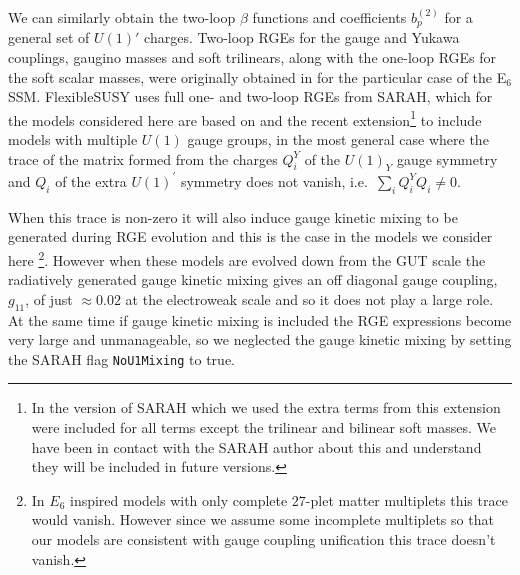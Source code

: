 \documentclass[preprint,amsmath,amssymb,aps,superscriptaddress,prd,showpacs,floatfix,nofootinbib]{revtex4-1}
\begin{document}
We can similarly obtain the two-loop $\beta$ functions and
coefficients $b_p^{(2)}$ for a general set of $U(1)'$
charges. Two-loop RGEs for the gauge and Yukawa couplings, gaugino masses and
soft trilinears, along with the one-loop RGEs for the soft scalar
masses, were originally obtained in \cite{Athron:2009bs} for the
particular case of the E$_6$SSM.  FlexibleSUSY uses full one- and
two-loop RGEs from SARAH, which for the models considered here are
based on \cite{Martin:1993zk} and the recent extension\footnote{In
the version of SARAH which we used the extra terms from this
extension were included for all terms except the trilinear and
bilinear soft masses. We have been in contact with the SARAH author
about this and understand they will be included in future
versions.}  \cite{Fonseca:2011vn} to include models with multiple
$U(1)$ gauge groups, in the most general case where the trace of the
matrix formed from the charges $Q^Y_i$ of the $U(1)_Y$ gauge symmetry
and $Q_i$ of the extra $U(1)^\prime$ symmetry does not vanish,
i.e.~$\sum_i Q_i^YQ_i \neq 0$.  

When this trace is non-zero it will also induce gauge kinetic mixing
to be generated during RGE evolution and this is the case in the
models we consider here \footnote{In $E_6$ inspired models with only
  complete $27$-plet matter multiplets this trace would vanish.
  However since we assume some incomplete multiplets so that our
  models are consistent with gauge coupling unification this trace
  doesn't vanish.}. However when these models are evolved down from
the GUT scale the radiatively generated gauge kinetic mixing gives an
off diagonal gauge coupling, $g_{11}$, of just $\approx 0.02$ at the
electroweak scale \cite{King:2005jy} and so it does not play a large
role.  At the same time if gauge kinetic mixing is included the RGE
expressions become very large and unmanageable, so we neglected the
gauge kinetic mixing by setting the SARAH flag \texttt{NoU1Mixing} to true.
\end{document}
